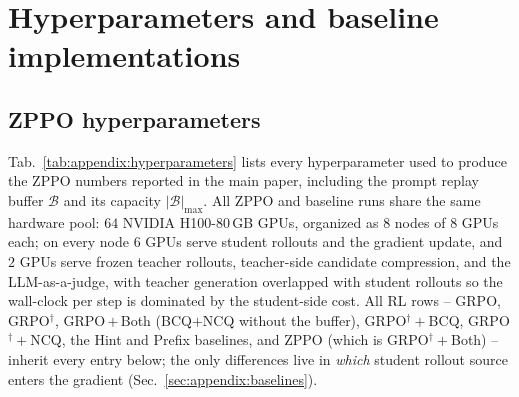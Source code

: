 \section{Hyperparameters and baseline implementations}
\label{sec:appendix:hyperparameters}

\subsection{ZPPO hyperparameters}
\label{sec:appendix:hyperparameters:zppo}

Tab.~\ref{tab:appendix:hyperparameters} lists every hyperparameter used to produce the ZPPO numbers reported in the main paper, including the prompt replay buffer $\mathcal{B}$ and its capacity $|\mathcal{B}|_{\max}$. All ZPPO and baseline runs share the same hardware pool: $64$ NVIDIA H100-$80$\,GB GPUs, organized as $8$ nodes of $8$ GPUs each; on every node $6$ GPUs serve student rollouts and the gradient update, and $2$ GPUs serve frozen teacher rollouts, teacher-side candidate compression, and the LLM-as-a-judge, with teacher generation overlapped with student rollouts so the wall-clock per step is dominated by the student-side cost. All RL rows -- GRPO, GRPO$^{\dagger}$, GRPO\,$+$\,Both (BCQ$+$NCQ without the buffer), GRPO$^{\dagger}\!+\!$BCQ, GRPO$^{\dagger}\!+\!$NCQ, the Hint and Prefix baselines, and ZPPO (which is GRPO$^{\dagger}\!+\!$Both) -- inherit every entry below; the only differences live in \emph{which} student rollout source enters the gradient (Sec.~\ref{sec:appendix:baselines}).

